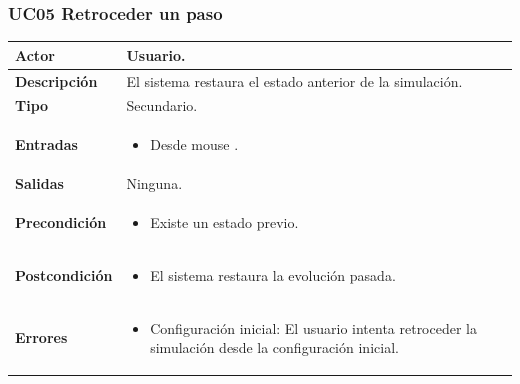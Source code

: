 \subsubsection*{UC05 Retroceder un paso}

\begin{table}[H]
	\begin{center}
		\begin{tabular}{| p{} | p{} |}
			\hline 
			\textbf{Actor} & Usuario. \\ \hline
			\textbf{Descripción} & El sistema restaura el estado anterior de la simulación. \\ \hline
			\textbf{Tipo} & Secundario. \\ \hline
			\textbf{Entradas} &
			\begin{itemize}[noitemsep, nosep]
				\item Desde mouse \BTN{paso_atras}.
			\end{itemize}
			\\ \hline
			\textbf{Salidas} & Ninguna. \\ \hline
			\textbf{Precondición} & \begin{itemize}[noitemsep, nosep]
				\item Existe un estado previo.
			\end{itemize}
			\\ \hline
			\textbf{Postcondición} & \begin{itemize}[noitemsep, nosep]
				\item El sistema restaura la evolución pasada.
			\end{itemize}  \\ \hline
			\textbf{Errores} & 
			\begin{itemize}[noitemsep, nosep]
				\item Configuración inicial: El usuario intenta retroceder la simulación desde la configuración inicial.
			\end{itemize}\\ \hline
		\end{tabular}
	\end{center}
\end{table}


